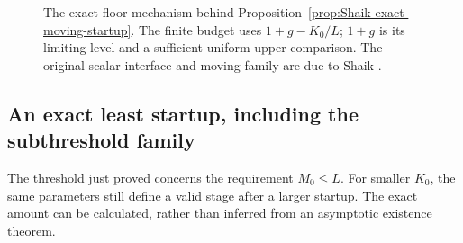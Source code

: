 \begin{figure}[ht]
\centering
{}
\caption{The exact floor mechanism behind
Proposition~\ref{prop:Shaik-exact-moving-startup}. The finite budget uses
\(1+g-K_0/L\); \(1+g\) is its limiting level and a sufficient uniform
upper comparison. The original scalar interface and moving family
are due to Shaik \cite{Shaik2026v324}.}
\end{figure}

\subsection{An exact least startup, including the subthreshold family}

The threshold just proved concerns the requirement \(M_0\le L\).
For smaller \(K_0\), the same parameters still define a valid stage
after a larger startup. The exact amount can be calculated, rather
than inferred from an asymptotic existence theorem.


